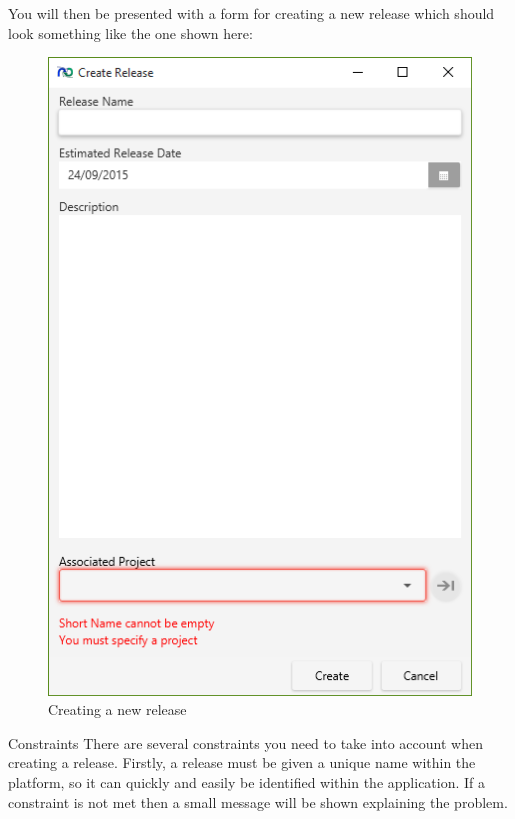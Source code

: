 You will then be presented with a form for creating a new release which should look something like the one shown here:

\begin{figure}[H]
\centering
\includegraphics[width=\textwidth]{images/screenshots/releases3.PNG}
\caption{Creating a new release}
\label{fig:new_project}
\end{figure}

Constraints
\newline
There are several constraints you need to take into account when creating a release. Firstly, a release must be given a unique name within the platform, so it can quickly and easily be identified within the application. If a constraint is not met then a small message will be shown explaining the problem.

